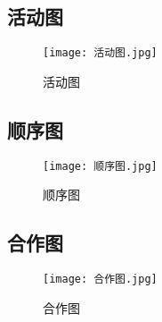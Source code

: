 \documentclass[../main.tex]{subfiles}
\begin{document}
\subsection{活动图}
\begin{figure}[H]
  \begin{center}
    \texttt{[image: 活动图.jpg]}
  \end{center}
  \caption{活动图}
\end{figure}

\subsection{顺序图}
\begin{figure}[H]
  \begin{center}
    \texttt{[image: 顺序图.jpg]}
  \end{center}
  \caption{顺序图}
\end{figure}

\subsection{合作图}
\begin{figure}[H]
  \begin{center}
    \texttt{[image: 合作图.jpg]}
  \end{center}
  \caption{合作图}
\end{figure}
\end{document}
